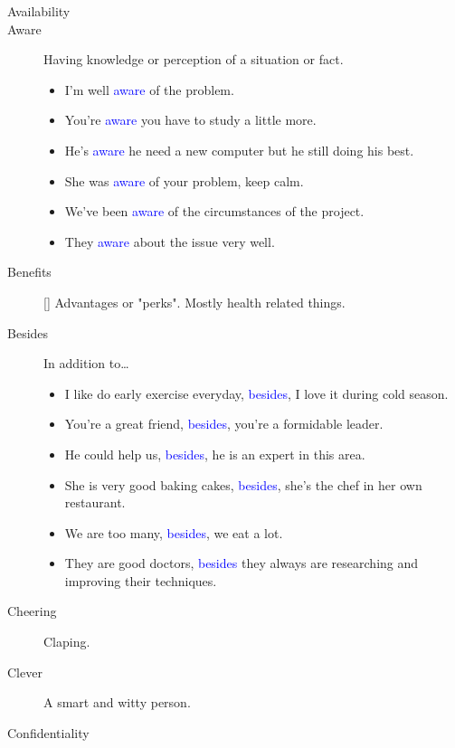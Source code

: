 \begin{multicols}{2}
\begin{description}
\item[Availability]

\item[Aware] Having knowledge or perception of a situation or fact.
\begin{itemize}
\item I'm well \textcolor{blue}{aware} of the problem.
\item You're \textcolor{blue}{aware} you have to study a little more.
\item He's \textcolor{blue}{aware} he need a new computer but he still doing his best.
\item She was \textcolor{blue}{aware} of your problem, keep calm.
\item We've been \textcolor{blue}{aware} of the circumstances of the project.
\item They \textcolor{blue}{aware} about the issue very well.
\end{itemize}
\item[Benefits] [\emph{}] Advantages or "perks". Mostly health related things.

\item[Besides] In addition to\dots
\begin{itemize}
\item I like do early exercise everyday, \textcolor{blue}{besides}, I love it during cold season.
\item You're a great friend, \textcolor{blue}{besides}, you're a formidable leader.
\item He could help us, \textcolor{blue}{besides}, he is an expert in this area.
\item She is very good baking cakes, \textcolor{blue}{besides}, she's the chef in her own restaurant.
\item We are too many, \textcolor{blue}{besides}, we eat a lot.
\item They are good doctors, \textcolor{blue}{besides} they always are researching and improving their techniques.
\end{itemize}

\item[Cheering] Claping.

\item[Clever] A smart and witty person.

\item[Confidentiality]


\end{description}
\end{multicols}
